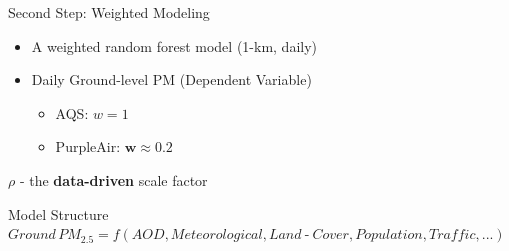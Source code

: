 \begin{frame}{Second Step: Weighted Modeling}
    \begin{itemize}
        \item A weighted random forest model (1-km, daily)
        \item Daily Ground-level PM (Dependent Variable)
        \begin{itemize}
            \item AQS: $w=1$
            \item PurpleAir: $\mathbf{w \approx 0.2}$
        \end{itemize}
    \end{itemize}
    \begin{center}
        $\rho$ - the \textbf{data-driven} scale factor
    \end{center}
    \begin{block}{Model Structure}
    \footnotesize
    $Ground\, PM_{2.5} = f(AOD, Meteorological, Land\operatorname{-}Cover, Population, Traffic, ...)$
    \end{block}
\end{frame}

